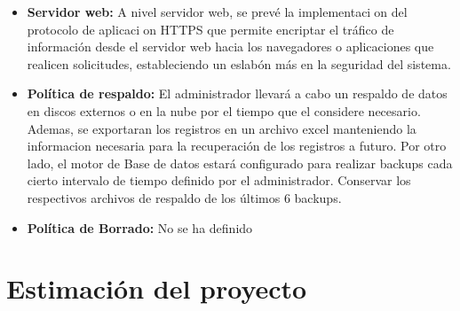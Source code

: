 \begin{itemize}
        \item \textbf{Servidor web:} A nivel servidor web, se prevé la implementacion del protocolo de aplicacion HTTPS que permite encriptar el tráfico de información desde el servidor web hacia los navegadores o aplicaciones que realicen solicitudes, estableciendo un eslabón más en la seguridad del sistema.
        \item \textbf{Política de respaldo:} El administrador llevará a cabo un respaldo de datos en discos externos o en la nube por el tiempo que el considere necesario. Ademas, se exportaran los registros en un archivo excel manteniendo la informacion necesaria para la recuperación de los registros a futuro.
        Por otro lado, el motor de Base de datos estará configurado para realizar backups cada cierto intervalo de tiempo definido por el administrador. Conservar los respectivos archivos de respaldo de los últimos 6 backups.
        \item \textbf{Política de Borrado:} No se ha definido
      \end{itemize}
      
  \section{Estimación del proyecto}